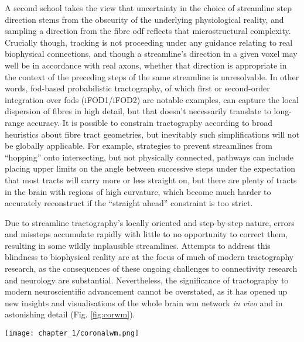 A second school takes the view that uncertainty in the choice of streamline step direction stems from the obscurity of the underlying physiological reality, and sampling a direction from the fibre \gls{odf} reflects that microstructural complexity.
Crucially though, tracking is not proceeding under any guidance relating to real biophysical connections, and though a streamline's direction in a given voxel may well be in accordance with real axons, whether that direction is appropriate in the context of the preceding steps of the same streamline is unresolvable.
In other words, \gls{fod}-based probabilistic tractography, of which first or second-order integration over \glspl{fod}  (iFOD1/iFOD2)\autocite{Tournier2012,Tournier2010} are notable examples, can capture the local dispersion of fibres in high detail, but that doesn't necessarily translate to long-range accuracy.
It is possible to constrain tractography according to broad heuristics about fibre tract geometries, but inevitably such simplifications will not be globally applicable.
For example, strategies to prevent streamlines from ``hopping'' onto intersecting, but not physically connected, pathways can include placing upper limits on the angle between successive steps under the expectation that most tracts will carry more or less straight on, but there are plenty of tracts in the brain with regions of high curvature, which become much harder to accurately reconstruct if the ``straight ahead'' constraint is too strict.

Due to streamline tractography's locally oriented and step-by-step nature, errors and missteps accumulate rapidly with little to no opportunity to correct them, resulting in some wildly implausible streamlines.
Attempts to address this blindness to biophysical reality are at the focus of much of modern tractography research\autocite{Bastiani2017,Rheault2019,Aydogan2021}, as the consequences of these ongoing challenges to connectivity research and neurology are substantial\autocite{Schilling2019, Yang2021, Grisot2021}.
Nevertheless, the significance of tractography to modern neuroscientific advancement cannot be overstated, as it has opened up new insights and visualisations of the whole brain \gls{wm} network \textit{in vivo} and in astonishing detail (Fig. \ref{fig:corwm}).

\begin{SCfigure}
  \texttt{[image: chapter\_1/coronalwm.png]}
  \caption[dMRI white matter imaging and tractography]{Coronal section of the author's white matter, imaged with \gls{csd} \gls{dec} mapping and streamline tractography. The \glspl{cst} are visible radiating from the cortex to converge in the internal capsules before descending through the anterior pons, perpendicular to the middle cerebellar peduncle fibres. Either side of the pons, the trigeminal nerves (cranial nerve V) are visible as small green dots.}
  \label{fig:corwm}
\end{SCfigure}

